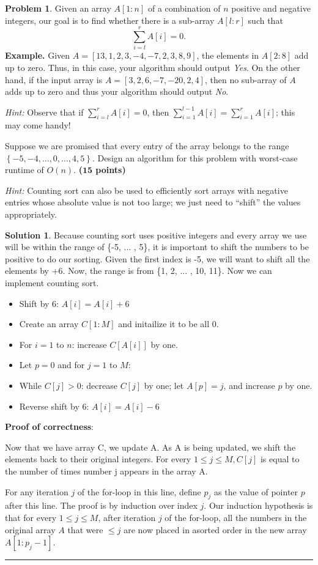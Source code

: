 \documentclass{article}
\theoremstyle{definition}
\newtheorem{problem}{Problem}
\def\fline{\rule{0.75\linewidth}{0.5pt}}
\newcommand{\finishline}{\begin{center}\fline\end{center}}
\newtheorem*{solution*}{Solution}
\newenvironment{solution}{\begin{solution*}}{{\finishline} \end{solution*}}
\newcommand{\grade}[1]{\hfill{\textbf{($\mathbf{#1}$ points)}}}
\newcommand{\set}[1]{\ensuremath{\left\{ #1 \right\}}}
\begin{document}
\begin{problem}
Given an array $A[1:n]$ of a combination of $n$ positive and negative integers, our goal is to find whether there is a sub-array $A[l:r]$ such that
\[
    \sum_{i=l}^r A[i] = 0.
\]
\textbf{Example.} Given $A = [13,1,2,3,-4,-7,2,3,8,9]$, the elements in $A[2:8]$ add up to zero. Thus, in this case, your algorithm should output \emph{Yes}. 
On the other hand, if the input array is $A = [3,2,6,-7,-20,2,4]$, then no sub-array of $A$ adds up to zero and thus your algorithm should output \emph{No}. 

\emph{Hint:} Observe that if $\sum_{i=l}^r A[i] = 0$, then $\sum_{i=1}^{l-1} A[i] = \sum_{i=1}^{r} A[i]$; this may come handy! 

\begin{enumerate}
\item[(a)] Suppose we are promised that every entry of the array belongs to the range $\set{-5,-4,\ldots,0,\ldots,4,5}$. Design an algorithm for this problem with worst-case  runtime of $O(n)$. \grade{15}

\emph{Hint:} Counting sort can also be used to efficiently sort arrays with negative entries whose absolute value is not too large; we just need to ``shift'' the values appropriately. 


	\begin{solution}
		Because counting sort uses positive integers and every array we use will be within the range of \{-5, ... , 5\}, it is important to shift the numbers to be positive to do our sorting. Given the first index is -5, we will want to shift all the elements by +6. Now, the range is from \{1, 2, ... , 10, 11\}. Now we can implement counting sort. 
	\begin{itemize}
	\item Shift by 6: $A[i] = A[i] + 6$
        \item Create an array $C[1:M]$ and initailize it to be all 0.
        \item For $i = 1$ to $n$: increase $C[A[i]]$ by one.
        \item Let $p = 0$ and for $j = 1$ to $M$:
	\item While $C[j] > 0$: decrease $C[j]$ by one; let $A[p] = j$, and increase $p$ by one. 
	\item Reverse shift by 6: $A[i] = A[i] - 6$
    	\end{itemize}
	
	\item\textbf{Proof of correctness}:
	\item Now that we have array C, we update A. As A is being updated, we shift the elements back to their original integers. For every $1 \leq j \leq M, C[j]$ is equal to the number of times number j appears in the array A.
	\item For any iteration $j$ of the for-loop in this line, define $p_j$ as the value of pointer $p$ after this line. The proof is by induction over index $j$.  Our induction hypothesis is that for every $1 \leq j \leq M$, after iteration $j$ of the for-loop, all the numbers in the original array $A$ that were $\leq j$ are now placed in asorted order in the new array $A[1 : p_j - 1]$.


\end{solution}
\end{enumerate}
\end{problem}
\end{document}
